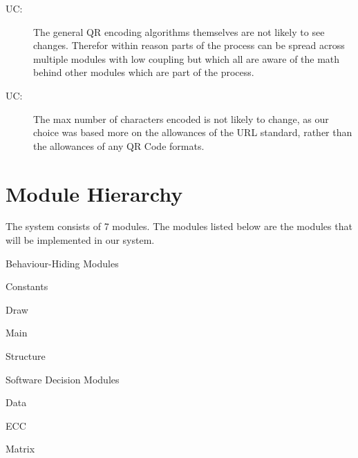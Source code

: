 \documentclass[12pt, titlepage]{article}
\newcounter{ucnum}
\newcommand{\uctheucnum}{UC\theucnum}
\newcounter{mnum}
\newcommand{\mthemnum}{M\themnum}
\begin{document}
\begin{description}
\item[ \uctheucnum \label{ucAlgorithms}:] 
The general QR encoding algorithms themselves are not likely to see changes. Therefor within reason parts of the process can be spread across multiple modules with low coupling but which all are aware of the math behind other modules which are part of the process.

\item[ \uctheucnum \label{ucInput}:] 
The max number of characters encoded is not likely to change, as our choice was based more on the allowances of the URL standard, rather than the allowances of any QR Code formats.

\end{description}

\section{Module Hierarchy} \label{SecMH}

The system consists of 7 modules. The modules listed below are the modules that will be implemented in our system.
\begin{description}

 \item [ \mthemnum \label{mHH}:] Behaviour-Hiding Modules

 \item Constants
 \item Draw 
 \item Main 
 \item Structure 
 \item [\refstepcounter{mnum} \mthemnum \label{mHH}:] Software Decision Modules
 \item Data 
 \item ECC
 \item Matrix
\end{description}
\end{document}
